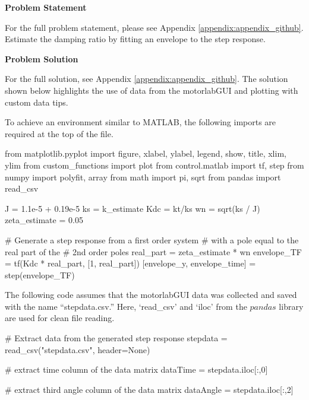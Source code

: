 \begin{tcolorbox}[breakable, enhanced jigsaw, title=ME 570: Assignment \ref{control_assignment_1}, 
    colframe=ksu-purple, colback=ksu-gray]

    \textbf{Problem Statement}
    \parindent15pt

    For the full problem statement, please see Appendix \ref{appendix:appendix_github}. Estimate
    the damping ratio by fitting an envelope to the step response.
    
    \tcblower
    \textbf{Problem Solution}
    \parindent15pt

    For the full solution, see Appendix \ref{appendix:appendix_github}. The solution shown below
    highlights the use of data from the motorlabGUI and plotting with custom data tips.

    To achieve an environment similar to MATLAB, the following imports are required at the top of the file.

\begin{python}
from matplotlib.pyplot import figure, xlabel, ylabel, legend, show, title, xlim, ylim
from custom_functions import plot
from control.matlab import tf, step
from numpy import polyfit, array
from math import pi, sqrt
from pandas import read_csv
\end{python}

\begin{python}
J = 1.1e-5 + 0.19e-5
ks = k_estimate
Kdc = kt/ks
wn = sqrt(ks / J)
zeta_estimate = 0.05
 
# Generate a step response from a first order system 
# with a pole equal to the real part of the
# 2nd order poles
real_part = zeta_estimate * wn
envelope_TF = tf(Kdc * real_part, [1, real_part])
[envelope_y, envelope_time] = step(envelope_TF)
\end{python}

The following code assumes that the motorlabGUI data was collected
and saved with the name ``stepdata.csv.'' Here, `read\_csv' and
`iloc' from the $pandas$ library are used for clean file reading.

\begin{python}
# Extract data from the generated step response
stepdata = read_csv("stepdata.csv", header=None)

# extract time column of the data matrix
dataTime = stepdata.iloc[:,0]

# extract third angle column of the data matrix
dataAngle = stepdata.iloc[:,2]


\end{python}
\end{tcolorbox}
